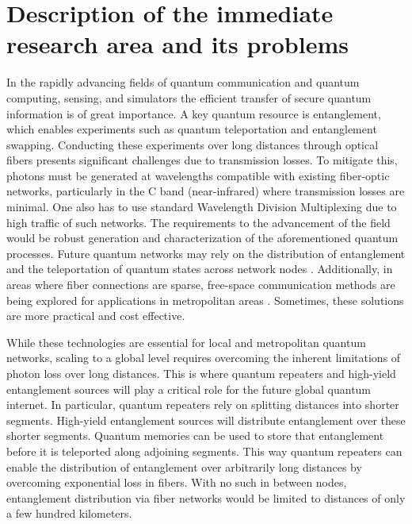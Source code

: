 \documentclass{article}
\begin{document}
\section{Description of the immediate research area and its problems}

In the rapidly advancing fields of quantum communication and quantum computing, sensing, and simulators
the efficient transfer of secure quantum information is of great importance.
A key quantum resource is entanglement, which enables experiments such as quantum teleportation and entanglement swapping.
Conducting these experiments over long distances through optical fibers presents significant challenges due to transmission losses.
To mitigate this, photons must be generated at wavelengths compatible with existing fiber-optic networks,
particularly in the C band (near-infrared) where transmission losses are minimal.
One also has to use standard Wavelength Division Multiplexing due to high traffic of such networks.
The requirements to the advancement of the field would be robust generation and characterization of the aforementioned quantum processes.
Future quantum networks may rely on the distribution of entanglement and the teleportation of quantum states across network nodes \cite{Kimble_2008}.
Additionally, in areas where fiber connections are sparse,
free-space communication methods are being explored for applications in metropolitan areas \cite{Kržić_et_al_2023}. Sometimes,
these solutions are more practical and cost effective.
\par While these technologies are essential for local and metropolitan quantum networks, scaling to a global level requires overcoming
the inherent limitations of photon loss over long distances. This is where quantum repeaters and high-yield entanglement sources
will play a critical role for the future global quantum internet.
In particular, quantum repeaters rely on splitting distances into shorter segments. High-yield entanglement sources will distribute entanglement over these shorter segments.
Quantum memories can be used to store that entanglement before it is teleported along adjoining segments.
This way quantum repeaters can enable the distribution of entanglement over arbitrarily long distances by overcoming exponential loss in fibers.
With no such in between nodes, entanglement distribution via fiber networks would be limited to distances of only a few hundred kilometers.
\end{document}
